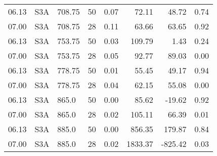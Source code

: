 \documentclass[preview]{standalone}
\begin{document}
\begin{table}
\begin{tabular}{llllrrrr}
06.13 &  S3A &  708.75 &  50 &  0.07 &  72.11 &  48.72 & 0.74 \\
07.00 &  S3A &  708.75 &  28 &  0.11 &   63.66 &   63.65 & 0.92 \\\hline
06.13 &  S3A &  753.75 &  50 &  0.03 & 109.79 &   1.43 & 0.24 \\
07.00 &  S3A &  753.75 &  28 &  0.05 &   92.77 &   89.03 & 0.00 \\\hline
06.13 &  S3A &  778.75 &  50 &  0.01 &  55.45 &  49.17 & 0.94 \\
07.00 &  S3A &  778.75 &  28 &  0.04 &   62.15 &   55.08 & 0.00 \\\hline
06.13 &  S3A &   865.0 &  50 &  0.00 &  85.62 & -19.62 & 0.92 \\
07.00 &  S3A &   865.0 &  28 &  0.02 &  105.11 &   66.39 & 0.01 \\\hline
06.13 &  S3A &   885.0 &  50 &  0.00 & 856.35 & 179.87 & 0.84 \\
07.00 &  S3A &   885.0 &  28 &  0.02 & 1833.37 & -825.42 & 0.03 \\\hline
\bottomrule
\end{tabular}



\end{table}
\end{document}
